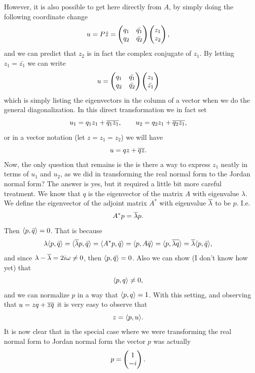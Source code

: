 However, it is also possible to get here directly from $A$, by simply doing the following coordinate change
\[ u = P\hat{z} = \begin{pmatrix} q_1 & \bar{q_1} \\ q_2 & \bar{q_2} \end{pmatrix} \begin{pmatrix} z_1 \\ z_2 \end{pmatrix}, \]
and we can predict that $z_2$ is in fact the complex conjugate of $z_1$. By letting $z_1 = \bar{z_1}$ we can write
\[ u = \begin{pmatrix} q_1 & \bar{q_1} \\ q_2 & \bar{q_2} \end{pmatrix} \begin{pmatrix} z_1 \\ \bar{z_1} \end{pmatrix}  \]
which is simply listing the eigenvectors in the column of a vector when we do the general diagonalization. In this direct transformation we in fact set
\[ u_1 = q_1z_1 + \overline{q_1 z_1},\qquad u_2 = q_2z_1 + \overline{q_2z_1}, \]
or in a vector notation (let $z = z_1 = z_2$) we will have
\[ u = qz + \overline{qz}. \]
Now, the only question that remains is the is there a way to express $z_1$ neatly in terms of $u_1$ and $u_2$, as we did in transforming the real normal form to the Jordan normal form? The answer is yes, but it required a little bit more careful treatment. We know that $q$ is the eigenvector of the matrix $A$ with eigenvalue $\lambda$. We define the eigenvector of the adjoint matrix $A^*$ with eigenvalue $\overline{\lambda}$ to be $p$. I.e. 
\[ A^* p = \overline{\lambda} p. \]
Then $\langle p , \bar{q} \rangle = 0$. That is because 
\[ \lambda \langle p , \bar{q} \rangle = \langle \overline{\lambda}p , \bar{q} \rangle = \langle A^*p , \bar{q} \rangle = \langle p , A\bar{q} \rangle = \langle p , \overline{\lambda q} \rangle = \overline{\lambda}\langle p , \bar{q} \rangle,  \]
and since $\lambda - \overline{\lambda} = 2i\omega \neq 0$, then $\langle p , \bar{q} \rangle = 0$. Also we can show (I don't know how yet) that
\[ \langle p , q \rangle \neq 0,\]
and we can normalize $p$ in a way that $\langle p , q \rangle = 1$. With this setting, and observing that $u = zq + \overline{zq}$ it is very easy to observe that
\[ z = \langle p , u \rangle. \]
It is now clear that in the special case where we were transforming the real normal form to Jordan normal form the vector $p$ was actually
\[ p = \begin{pmatrix} 1 \\ -i \end{pmatrix}. \]





